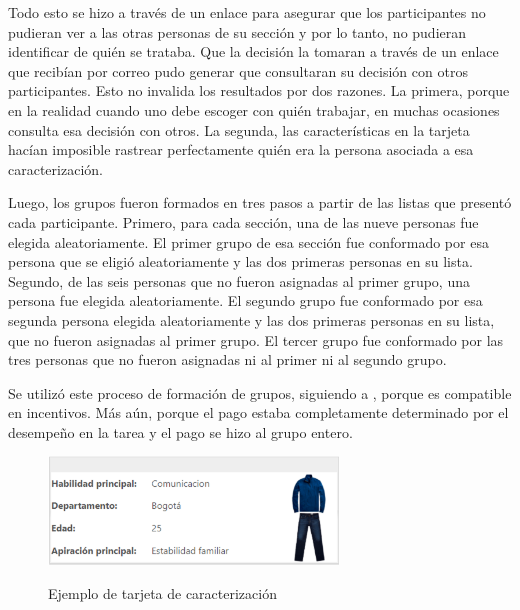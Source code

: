 Todo esto se hizo a través de un enlace para asegurar que los participantes no pudieran ver a las otras personas de su sección y por lo tanto, no pudieran identificar de quién se trataba. Que la decisión la tomaran a través de un enlace que recibían por correo pudo generar que consultaran su decisión con otros participantes. Esto no invalida los resultados por dos razones. La primera, porque en la realidad cuando uno debe escoger con quién trabajar, en muchas ocasiones consulta esa decisión con otros. La segunda, las características en la tarjeta hacían imposible rastrear perfectamente quién era la persona asociada a esa caracterización.

Luego, los grupos fueron formados en tres pasos a partir de las listas que presentó cada participante. Primero, para cada sección, una de las nueve personas fue elegida aleatoriamente. El primer grupo de esa sección fue conformado por esa persona que se eligió aleatoriamente y las dos primeras personas en su lista. Segundo, de las seis personas que no fueron asignadas al primer grupo, una persona fue elegida aleatoriamente. El segundo grupo fue conformado por esa segunda persona elegida aleatoriamente y las dos primeras personas en su lista, que no fueron asignadas al primer grupo. El tercer grupo fue conformado por las tres personas que no fueron asignadas ni al primer ni al segundo grupo.

Se utilizó este proceso de formación de grupos, siguiendo a \cite{beautifulorwhite2012}, porque es compatible en incentivos. Más aún, porque el pago estaba completamente determinado por el desempeño en la tarea y el pago se hizo al grupo entero.

\begin{figure}[htbp]
	\centering
	\caption{Ejemplo de tarjeta de caracterización}
	\includegraphics[width=7.7cm]{Images/tarjeta}
	\label{fig:tarjeta}
    \begin{singlespace}
    \end{singlespace}
\end{figure}

